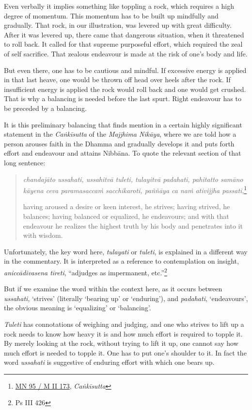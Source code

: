 Even verbally it implies something like toppling a rock, which requires a high degree of momentum. This momentum has to be built up mindfully and gradually. That rock, in our illustration, was levered up with great difficulty. After it was levered up, there came that dangerous situation, when it threatened to roll back. It called for that supreme purposeful effort, which required the zeal of self sacrifice. That zealous endeavour is made at the risk of one's body and life.

But even there, one has to be cautious and mindful. If excessive energy is applied in that last heave, one would be thrown off head over heels after the rock. If insufficient energy is applied the rock would roll back and one would get crushed. That is why a balancing is needed before the last spurt. Right endeavour has to be preceded by a balancing.

It is this preliminary balancing that finds mention in a certain highly significant statement in the \emph{Caṅkīsutta} of the \emph{Majjhima Nikāya}, where we are told how a person arouses faith in the Dhamma and gradually develops it and puts forth effort and endeavour and attains Nibbāna. To quote the relevant section of that long sentence:

\begin{quote}
\emph{chandajāto ussahati, ussahitvā tuleti, tulayitvā padahati, pahitatto samāno kāyena ceva paramasaccaṁ sacchikaroti, paññāya ca naṁ ativijjha passati},\footnote{\href{https://suttacentral.net/mn95/pli/ms}{MN 95 / M II 173}, \emph{Caṅkīsutta}}

having aroused a desire or keen interest, he strives; having strived, he balances; having balanced or equalized, he endeavours; and with that endeavour he realizes the highest truth by his body and penetrates into it with wisdom.
\end{quote}

Unfortunately, the key word here, \emph{tulayati} or \emph{tuleti}, is explained in a different way in the commentary. It is interpreted as a reference to contemplation on insight, \emph{aniccādivasena tīreti}, ``adjudges as impermanent, etc.''\footnote{Ps III 426}

But if we examine the word within the context here, as it occurs between \emph{ussahati}, `strives' (literally `bearing up' or `enduring'), and \emph{padahati}, `endeavours', the obvious meaning is `equalizing' or `balancing'.

\emph{Tuleti} has connotations of weighing and judging, and one who strives to lift up a rock needs to know how heavy it is and how much effort is required to topple it. By merely looking at the rock, without trying to lift it up, one cannot say how much effort is needed to topple it. One has to put one's shoulder to it. In fact the word \emph{ussahati} is suggestive of enduring effort with which one bears up.

